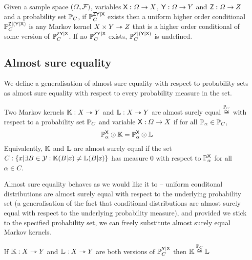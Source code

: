 \begin{definition}\label{def:ho_cprob_pset}
Given a sample space $(\Omega,\mathcal{F})$, variables $\mathsf{X}:\Omega\to X$, $\mathsf{Y}:\Omega\to Y$ and $\mathsf{Z}:\Omega\to Z$ and a probability set $\mathbb{P}_C$, if $\mathbb{P}_C^{\mathsf{ZY}|\mathsf{X}}$ exists then a uniform higher order conditional $\mathbb{P}_C^{\mathsf{Z}|(\mathsf{Y}|\mathsf{X})}$ is any Markov kernel $X\times Y\rightarrowtriangle Z$ that is a higher order conditional of some version of $\mathbb{P}_C^{\mathsf{ZY}|\mathsf{X}}$. If no $\mathbb{P}_C^{\mathsf{ZY}|\mathsf{X}}$ exists, $\mathbb{P}_C^{\mathsf{Z}|(\mathsf{Y}|\mathsf{X})}$ is undefined.
\end{definition}


\subsection{Almost sure equality}

We define a generalisation of almost sure equality with respect to probability sets as almost sure equality with respect to every probability measure in the set.

\begin{definition}\label{def:asequal}
Two Markov kernels $\mathbb{K}:X\rightarrowtriangle Y$ and $\mathbb{L}:X\rightarrowtriangle Y$ are almost surely equal $\overset{\mathbb{P}_C}{\cong}$ with respect to a probability set $\mathbb{P}_C$ and variable $\mathsf{X}:\Omega\to X$ if for all $\mathbb{P}_\alpha \in \mathbb{P}_C$,
\begin{align}
    \mathbb{P}^{\mathsf{X}}_\alpha\odot \mathbb{K}=\mathbb{P}^{\mathsf{X}}_\alpha\odot \mathbb{L}
\end{align}
Equivalently, $\mathbb{K}$ and $\mathbb{L}$ are almost surely equal if the set $C:\{x|\exists B\in\mathcal{Y}:\mathbb{K}(B|x)\neq\mathbb{L}(B|x)\}$ has measure 0 with respect to $\mathbb{P}_\alpha^{\mathsf{X}}$ for all $\alpha\in C$.
\end{definition}

Almost sure equality behaves as we would like it to -- uniform conditonal distributions are almost surely equal with respect to the underlying probability set (a generalisation of the fact that conditional distributions are almost surely equal with respect to the underlying probability measure), and provided we stick to the specified probability set, we can freely substitute almost surely equal Markov kernels.

\begin{lemma}
If $\mathbb{K}:X\rightarrowtriangle Y$ and $\mathbb{L}:X\rightarrowtriangle Y$ are both versions of $\mathbb{P}_C^{\mathsf{Y}|\mathsf{X}}$ then $\mathbb{K}\overset{\mathbb{P}_C}{\cong}\mathbb{L}$
\end{lemma}

